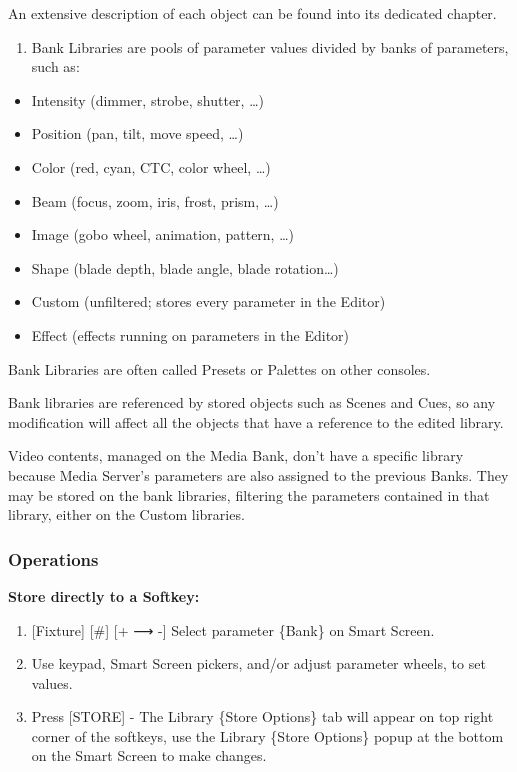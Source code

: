 \documentclass[
]{article}
\providecommand{\tightlist}{%
  \setlength{\itemsep}{0pt}\setlength{\parskip}{0pt}}
\begin{document}
An extensive description of each object can be found into its dedicated chapter.

\begin{enumerate}
\def\labelenumi{\arabic{enumi}.}
\setcounter{enumi}{1}
\tightlist
\item
  Bank Libraries are pools of parameter values divided by banks of parameters, such as:
\end{enumerate}

\begin{itemize}
\item
  Intensity (dimmer, strobe, shutter, \ldots)
\item
  Position (pan, tilt, move speed, \ldots)
\item
  Color (red, cyan, CTC, color wheel, \ldots)
\item
  Beam (focus, zoom, iris, frost, prism, \ldots)
\item
  Image (gobo wheel, animation, pattern, \ldots)
\item
  Shape (blade depth, blade angle, blade rotation\ldots)
\item
  Custom (unfiltered; stores every parameter in the Editor)
\item
  Effect (effects running on parameters in the Editor)
\end{itemize}

Bank Libraries are often called Presets or Palettes on other consoles.

Bank libraries are referenced by stored objects such as Scenes and Cues, so any modification will affect all the objects that have a reference to the edited library.

Video contents, managed on the Media Bank, don't have a specific library because Media Server's parameters are also assigned to the previous Banks. They may be stored on the bank libraries, filtering the parameters contained in that library, either on the Custom libraries.

\hypertarget{operations}{%
\subsubsection{Operations}\label{operations}}

\textbf{Store directly to a Softkey:}

\begin{enumerate}
\def\labelenumi{\arabic{enumi}.}
\item
  {[}Fixture{]} {[}\#{]} {[}+ ⟶ -{]} Select parameter \{Bank\} on Smart Screen.
\item
  Use keypad, Smart Screen pickers, and/or adjust parameter wheels, to set values.
\item
  Press {[}STORE{]} - The Library \{Store Options\} tab will appear on top right corner of the softkeys, use the Library \{Store Options\} popup at the bottom on the Smart Screen to make changes.
\end{enumerate}
\end{document}
